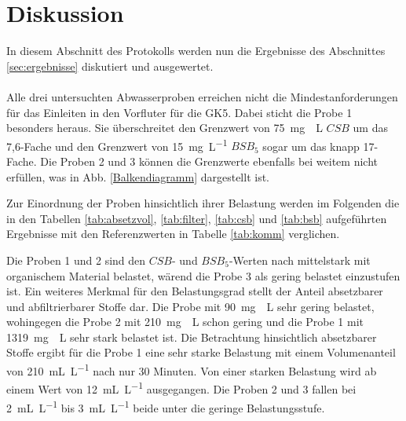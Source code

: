 \chapter{Diskussion}
\label{sec:diskussion}
In diesem Abschnitt des Protokolls werden nun die Ergebnisse des Abschnittes \ref{sec:ergebnisse} diskutiert und ausgewertet.\\\\



Alle drei untersuchten Abwasserproben erreichen nicht die Mindestanforderungen für das Einleiten in den Vorfluter für die GK5. Dabei sticht die Probe 1 besonders heraus. Sie überschreitet den Grenzwert von \SI{75}{\milli\gram
	\per\liter} $CSB$ um das 7,6-Fache und den Grenzwert von \SI{15}{\milli\gram\per\liter} $BSB_5$ sogar um das knapp 17-Fache. Die Proben 2 und 3 können die Grenzwerte ebenfalls bei weitem nicht erfüllen, was in Abb. \ref{Balkendiagramm} dargestellt ist. 


  
  Zur Einordnung der Proben hinsichtlich ihrer Belastung werden im Folgenden die in den Tabellen \ref{tab:absetzvol}, \ref{tab:filter}, \ref{tab:csb} und \ref{tab:bsb} aufgeführten Ergebnisse mit den Referenzwerten in Tabelle \ref{tab:komm} verglichen.
  
Die Proben 1 und 2 sind den $CSB$- und $BSB_5$-Werten nach mittelstark mit organischem Material belastet, wärend die Probe 3 als gering belastet einzustufen ist.
Ein weiteres Merkmal für den Belastungsgrad stellt der Anteil absetzbarer und abfiltrierbarer Stoffe dar. Die Probe mit \SI{90}{\milli\gram
	\per\liter} sehr gering belastet, wohingegen die Probe 2 mit \SI{210}{\milli\gram
	\per\liter} schon gering und die Probe 1 mit \SI{1319}{\milli\gram
	\per\liter} sehr stark belastet ist.
Die Betrachtung hinsichtlich absetzbarer Stoffe ergibt für die Probe 1 eine sehr starke Belastung mit einem Volumenanteil von \SI{210}{\milli\liter\per\liter} nach nur 30 Minuten. Von einer starken Belastung wird ab einem Wert von \SI{12}{\milli\liter\per\liter} ausgegangen. Die Proben 2 und 3 fallen bei \SI{2}{\milli\liter\per\liter} bis \SI{3}{\milli\liter\per\liter} beide unter die geringe Belastungsstufe.\\

